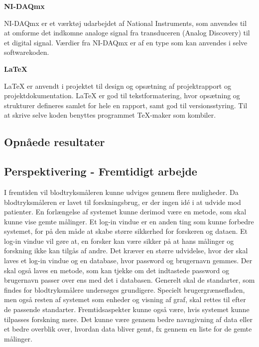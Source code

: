 \textbf{NI-DAQmx}

NI-DAQmx er et værktøj udarbejdet af National Instruments, som anvendes til at omforme det indkomne analoge signal fra transduceren (Analog Discovery) til et digital signal. Værdier fra NI-DAQmx er af en type som kan anvendes i selve softwarekoden. 

\textbf{LaTeX}

LaTeX er anvendt i projektet til design og opsætning af projektrapport og projektdokumentation. LaTeX er god til tekstformatering, hvor opsætning og strukturer defineres samlet for hele en rapport, samt god til versionsstyring. Til at skrive selve koden benyttes programmet TeX-maker som kombiler. 

\subsection{Opnåede resultater}
\subsection{Perspektivering - Fremtidigt arbejde}
I fremtiden vil blodtryksmåleren kunne udviges gennem flere muligheder. Da blodtryksmåleren er lavet til forskningsbrug, er der ingen idé i at udvide mod patienter.  En forlængelse af systemet kunne derimod være en metode, som skal kunne vise gemte målinger. \newline Et log-in vindue er en anden ting som kunne forbedre systemet, for på den måde at skabe større sikkerhed for forskeren og dataen. Et log-in vindue vil gøre at, en forsker kan være sikker på at hans målinger og forskning ikke kan tilgås af andre. Det kræver en større udvidelse, hvor der skal laves et log-in vindue og en database, hvor password og brugernavn gemmes. Der skal også laves en metode, som kan tjekke om det indtastede password og brugernavn passer over ens med det i databasen. 
\newline
Generelt skal de standarter, som findes for blodtryksmålere undersøges grundigere. Specielt brugergrænsefladen, men også resten af systemet som enheder og visning af graf, skal rettes til efter de passende standarter.
\newline 
Fremtidsaspekter kunne også være, hvis systemet kunne tilpasses forskning mere.  Det kunne være gennem bedre navngivning af data eller et bedre overblik over, hvordan data bliver gemt, fx gennem en liste for de gemte målinger.   